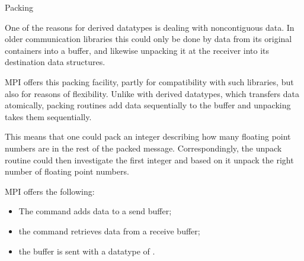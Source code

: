 \begin{comment}
  \Level 1 {Datatype signatures}
  \label{sec:signature}
  \index{datatype!signature|(}

  With the primitive types it pretty much went
  without saying that if the sender sends an array of doubles, the
  receiver had to declare the datatype also as doubles. With derived
  types that is no longer the case: the sender and receiver can declare
  a different datatype for the send and receive buffer, as long as these
  have the same \indextermbus{datatype}{signature}.

  The signature of a datatype is the internal representation of that
  datatype. For instance, if the sender declares a datatype consisting
  of two doubles, and it sends four elements of that type, the receiver
  can receive it as two elements of a type consisting of four doubles.

  You can also look at the signature as the form `under the hood' in which MPI
  sends the data.

  \index{datatype!signature|)}
\end{comment}

 {Packing}
\label{sec:pack}

One of the reasons for derived datatypes is dealing with noncontiguous data.
In older communication libraries this could only be done by  data
from its original containers into a buffer, and likewise unpacking it at the
receiver into its destination data structures.

MPI offers this packing facility, partly for compatibility with such libraries,
but also for reasons of flexibility. Unlike with derived datatypes,
which transfers data atomically, packing routines add data sequentially
to the buffer and unpacking takes them sequentially. 

This means that 
one could pack an integer describing how many floating point numbers
are in the rest of the packed message. 
Correspondingly, the unpack routine could then investigate the first integer
and based on it unpack the right number of floating point numbers.

MPI offers the following:
\begin{itemize}
\item The  command adds data to a send buffer;
\item the  command retrieves data from a receive buffer;
\item the buffer is sent with a datatype of .
\end{itemize}


